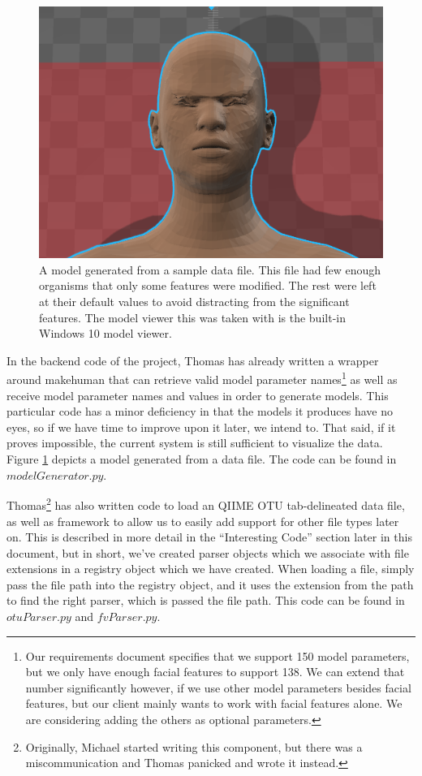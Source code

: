 \documentclass[letterpaper,10pt, onecolumn]{IEEEtran}
\begin{document}
\begin{figure}
	\includegraphics{Generated}
	\caption{A model generated from a sample data file. This file had few enough organisms that only some features were modified. The rest were left at their default values to avoid distracting from the significant features. The model viewer this was taken with is the built-in Windows 10 model viewer.}
	\label{fig:generated}
\end{figure}

In the backend code of the project, Thomas has already written a wrapper around makehuman that can retrieve valid model parameter names\footnote{Our requirements document specifies that we support 150 model parameters, but we only have enough facial features to support 138. We can extend that number significantly however, if we use other model parameters besides facial features, but our client mainly wants to work with facial features alone. We are considering adding the others as optional parameters.} as well as receive model parameter names and values in order to generate models. This particular code has a minor deficiency in that the models it produces have no eyes, so if we have time to improve upon it later, we intend to. That said, if it proves impossible, the current system is still sufficient to visualize the data. Figure \ref{fig:generated} depicts a model generated from a data file. The code can be found in $modelGenerator.py$.

Thomas\footnote{Originally, Michael started writing this component, but there was a miscommunication and Thomas panicked and wrote it instead.} has also written code to load an QIIME OTU tab-delineated data file, as well as framework to allow us to easily add support for other file types later on. This is described in more detail in the ``Interesting Code'' section later in this document, but in short, we've created parser objects which we associate with file extensions in a registry object which we have created. When loading a file, simply pass the file path into the registry object, and it uses the extension from the path to find the right parser, which is passed the file path. This code can be found in $otuParser.py$ and $fvParser.py$.
\end{document}
